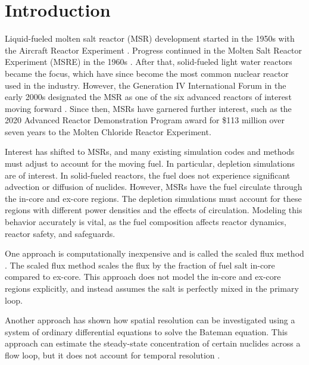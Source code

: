 \documentclass{style/nseJournal}
\begin{document}
\section{Introduction}\label{sec:1}

Liquid-fueled molten salt reactor (MSR) development started in the 1950s with the Aircraft Reactor Experiment \cite{bettis_aircraft_1957}.
Progress continued in the Molten Salt Reactor Experiment (MSRE) in the 1960s \cite{haubenreich_experience_1970}.
After that, solid-fueled light water reactors became the focus, which have since become the most common nuclear reactor used in the industry.
However, the Generation IV International Forum in the early 2000s designated the MSR as one of the six advanced reactors of interest moving forward \cite{kelly_generation_2014}.
Since then, MSRs have garnered further interest, such as the 2020 Advanced Reactor Demonstration Program award for \$113 million over seven years to the Molten Chloride Reactor Experiment.

Interest has shifted to MSRs, and many existing simulation codes and methods must adjust to account for the moving fuel.
In particular, depletion simulations are of interest.
In solid-fueled reactors, the fuel does not experience significant advection or diffusion of nuclides.
However, MSRs have the fuel circulate through the in-core and ex-core regions.
The depletion simulations must account for these regions with different power densities and the effects of circulation.
Modeling this behavior accurately is vital, as the fuel composition affects reactor dynamics, reactor safety, and safeguards.

One approach is computationally inexpensive and is called the scaled flux method \cite{betzler2021liquid}.
The scaled flux method scales the flux by the fraction of fuel salt in-core compared to ex-core.
This approach does not model the in-core and ex-core regions explicitly, and instead assumes the salt is perfectly mixed in the primary loop.

Another approach has shown how spatial resolution can be investigated using a system of ordinary differential equations to solve the Bateman equation.
This approach can estimate the steady-state concentration of certain nuclides across a flow loop, but it does not account for temporal resolution \cite{shahbazi_steady-state_2022}.
\end{document}
